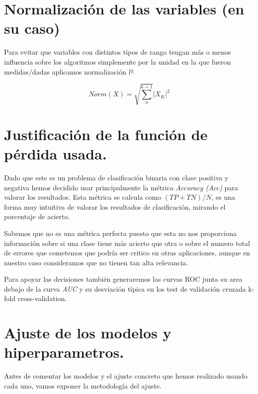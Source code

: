 \documentclass{article}
\begin{document}
\section{Normalización de las variables (en su caso)}

Para evitar que variables con distintos tipos de rango tengan más o menos influencia sobre los algoritmos simplemente por la unidad en la que fueron medidas/dadas aplicamos normalización \(l²\):

\[
    Norm(X) = \sqrt{\sum_{n}^{k=1}}\left | X_K \right |^2
\]



\section{Justificación de la función de pérdida usada.}

Dado que este es un problema de clasificación binaria con clase positiva y negativa hemos decidido usar principalmente la métrica \textit{Accuracy (Acc)} para valorar los resultados. Esta métrica se calcula como $(TP + TN) / N$, es una forma muy intuitiva de valorar los resultados de clasificación, mirando el porcentaje de acierto. 

Sabemos que no es una métrica perfecta puesto que esta no nos proporciona información sobre si una clase tiene más acierto que otra o sobre el numero total de errores que cometemos que podría ser critico en otras aplicaciones, aunque en nuestro caso consideramos que no tienen tan alta relevancia. 

Para apoyar las decisiones también generaremos las curvas ROC junta su area debajo de la curva \textit{AUC} y su desviación típica en los test de validación cruzada k-fold cross-validation.


\section{Ajuste de los modelos y hiperparametros.}

Antes de comentar los modelos y el ajuste concreto que hemos realizado usando cada uno, vamos exponer la metodología del ajuste.
\end{document}
